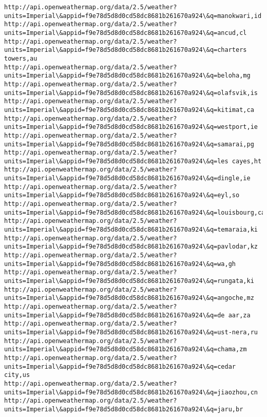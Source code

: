 \documentclass[11pt]{article}
\begin{document}
\begin{Verbatim}[commandchars=\\\{\}]
http://api.openweathermap.org/data/2.5/weather?units=Imperial\&appid=f9e78d5d8d0cd58dc8681b261670a924\&q=manokwari,id
http://api.openweathermap.org/data/2.5/weather?units=Imperial\&appid=f9e78d5d8d0cd58dc8681b261670a924\&q=ancud,cl
http://api.openweathermap.org/data/2.5/weather?units=Imperial\&appid=f9e78d5d8d0cd58dc8681b261670a924\&q=charters towers,au
http://api.openweathermap.org/data/2.5/weather?units=Imperial\&appid=f9e78d5d8d0cd58dc8681b261670a924\&q=beloha,mg
http://api.openweathermap.org/data/2.5/weather?units=Imperial\&appid=f9e78d5d8d0cd58dc8681b261670a924\&q=olafsvik,is
http://api.openweathermap.org/data/2.5/weather?units=Imperial\&appid=f9e78d5d8d0cd58dc8681b261670a924\&q=kitimat,ca
http://api.openweathermap.org/data/2.5/weather?units=Imperial\&appid=f9e78d5d8d0cd58dc8681b261670a924\&q=westport,ie
http://api.openweathermap.org/data/2.5/weather?units=Imperial\&appid=f9e78d5d8d0cd58dc8681b261670a924\&q=samarai,pg
http://api.openweathermap.org/data/2.5/weather?units=Imperial\&appid=f9e78d5d8d0cd58dc8681b261670a924\&q=les cayes,ht
http://api.openweathermap.org/data/2.5/weather?units=Imperial\&appid=f9e78d5d8d0cd58dc8681b261670a924\&q=dingle,ie
http://api.openweathermap.org/data/2.5/weather?units=Imperial\&appid=f9e78d5d8d0cd58dc8681b261670a924\&q=eyl,so
http://api.openweathermap.org/data/2.5/weather?units=Imperial\&appid=f9e78d5d8d0cd58dc8681b261670a924\&q=louisbourg,ca
http://api.openweathermap.org/data/2.5/weather?units=Imperial\&appid=f9e78d5d8d0cd58dc8681b261670a924\&q=temaraia,ki
http://api.openweathermap.org/data/2.5/weather?units=Imperial\&appid=f9e78d5d8d0cd58dc8681b261670a924\&q=pavlodar,kz
http://api.openweathermap.org/data/2.5/weather?units=Imperial\&appid=f9e78d5d8d0cd58dc8681b261670a924\&q=wa,gh
http://api.openweathermap.org/data/2.5/weather?units=Imperial\&appid=f9e78d5d8d0cd58dc8681b261670a924\&q=rungata,ki
http://api.openweathermap.org/data/2.5/weather?units=Imperial\&appid=f9e78d5d8d0cd58dc8681b261670a924\&q=angoche,mz
http://api.openweathermap.org/data/2.5/weather?units=Imperial\&appid=f9e78d5d8d0cd58dc8681b261670a924\&q=de aar,za
http://api.openweathermap.org/data/2.5/weather?units=Imperial\&appid=f9e78d5d8d0cd58dc8681b261670a924\&q=ust-nera,ru
http://api.openweathermap.org/data/2.5/weather?units=Imperial\&appid=f9e78d5d8d0cd58dc8681b261670a924\&q=chama,zm
http://api.openweathermap.org/data/2.5/weather?units=Imperial\&appid=f9e78d5d8d0cd58dc8681b261670a924\&q=cedar city,us
http://api.openweathermap.org/data/2.5/weather?units=Imperial\&appid=f9e78d5d8d0cd58dc8681b261670a924\&q=jiaozhou,cn
http://api.openweathermap.org/data/2.5/weather?units=Imperial\&appid=f9e78d5d8d0cd58dc8681b261670a924\&q=jaru,br

\end{Verbatim}
\end{document}
